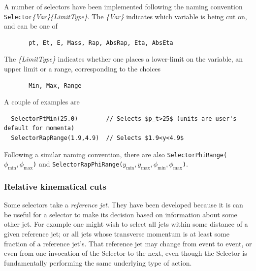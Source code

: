 \documentclass[12pt,a4]{article}
\newcommand{\ttt}[1]{{\small\texttt{#1}}}
\begin{document}
A number of selectors have been implemented following the naming
convention \ttt{Selector}{\it\{Var\}\{LimitType\}}. 
%
The {\it\{Var\}} indicates which variable is being cut on, and can be
one of 
\begin{lstlisting}
       pt, Et, E, Mass, Rap, AbsRap, Eta, AbsEta
\end{lstlisting}
%
The {\it\{LimitType\}} indicates whether one places a lower-limit on
the variable, an upper limit or a range, corresponding to the choices
\begin{lstlisting}
       Min, Max, Range
\end{lstlisting}
%
A couple of examples are
\begin{lstlisting}
  SelectorPtMin(25.0)        // Selects $p_t>25$ (units are user's default for momenta)
  SelectorRapRange(1.9,4.9)  // Selects $1.9<y<4.9$
\end{lstlisting}
Following a similar naming convention, there are also
\ttt{SelectorPhiRange(}$\phi_{\min},\phi_{\max}$\ttt{)} and
\ttt{SelectorRapPhiRange(}$y_{\min},y_{\max},\phi_{\min},\phi_{\max}$\ttt{)}.

\subsubsection{Relative kinematical cuts}

Some selectors take a \emph{reference jet}. 
%
They have been developed because it is can be useful for a selector to
make its decision based on information about some other jet. 
%
For example one might wish to select all jets within some distance of
a given reference jet; or all jets whose transverse momentum is at
least some fraction of a reference jet's.
%
That reference jet may change from event to event, or even from one
invocation of the Selector to the next, even though the Selector is
fundamentally performing the same underlying type of action.
\end{document}
